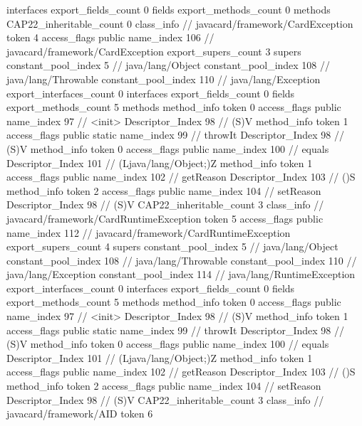 {{{			interfaces {
			}
			export_fields_count	0
			fields {
			}
			export_methods_count	0
			methods {
			}
			CAP22_inheritable_count	0
		}
		class_info {		// javacard/framework/CardException
			token	4
			access_flags	public
			name_index	106		// javacard/framework/CardException
			export_supers_count	3
			supers {
				constant_pool_index	5		// java/lang/Object
				constant_pool_index	108		// java/lang/Throwable
				constant_pool_index	110		// java/lang/Exception
			}
			export_interfaces_count	0
			interfaces {
			}
			export_fields_count	0
			fields {
			}
			export_methods_count	5
			methods {
				method_info {
					token	0
					access_flags	public
					name_index	97		// <init>
					Descriptor_Index	98		// (S)V
				}
				method_info {
					token	1
					access_flags	public static
					name_index	99		// throwIt
					Descriptor_Index	98		// (S)V
				}
				method_info {
					token	0
					access_flags	public
					name_index	100		// equals
					Descriptor_Index	101		// (Ljava/lang/Object;)Z
				}
				method_info {
					token	1
					access_flags	public
					name_index	102		// getReason
					Descriptor_Index	103		// ()S
				}
				method_info {
					token	2
					access_flags	public
					name_index	104		// setReason
					Descriptor_Index	98		// (S)V
				}
			}
			CAP22_inheritable_count	3
		}
		class_info {		// javacard/framework/CardRuntimeException
			token	5
			access_flags	public
			name_index	112		// javacard/framework/CardRuntimeException
			export_supers_count	4
			supers {
				constant_pool_index	5		// java/lang/Object
				constant_pool_index	108		// java/lang/Throwable
				constant_pool_index	110		// java/lang/Exception
				constant_pool_index	114		// java/lang/RuntimeException
			}
			export_interfaces_count	0
			interfaces {
			}
			export_fields_count	0
			fields {
			}
			export_methods_count	5
			methods {
				method_info {
					token	0
					access_flags	public
					name_index	97		// <init>
					Descriptor_Index	98		// (S)V
				}
				method_info {
					token	1
					access_flags	public static
					name_index	99		// throwIt
					Descriptor_Index	98		// (S)V
				}
				method_info {
					token	0
					access_flags	public
					name_index	100		// equals
					Descriptor_Index	101		// (Ljava/lang/Object;)Z
				}
				method_info {
					token	1
					access_flags	public
					name_index	102		// getReason
					Descriptor_Index	103		// ()S
				}
				method_info {
					token	2
					access_flags	public
					name_index	104		// setReason
					Descriptor_Index	98		// (S)V
				}
			}
			CAP22_inheritable_count	3
		}
		class_info {		// javacard/framework/AID
			token	6
}}}
